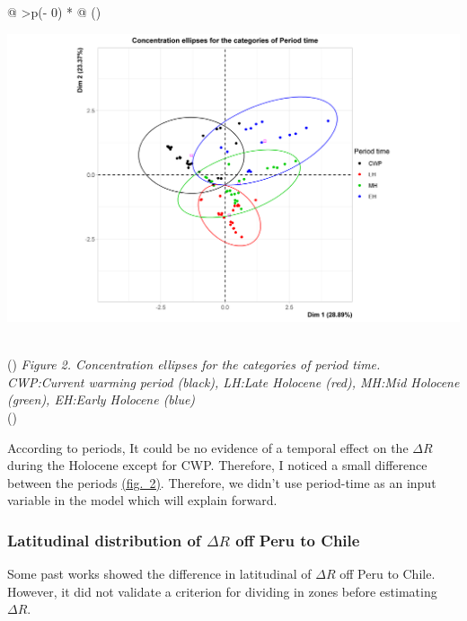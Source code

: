 \documentclass[
]{article}
\begin{document}
\begin{longtable}[]{@{}
  >{\centering\arraybackslash}p{(\columnwidth - 0\tabcolsep) * }@{}}
\toprule()
\begin{minipage}[b]{\linewidth}\centering
\href{https://github.com/jasb3110/Radiocarbon-reservoir/blob/db842ff0620d55ea5ca5ceec0d96a369406b6e3c/plotellipses.period.png?raw=true}{\includegraphics{plotellipses.period.png}}
\end{minipage} \\
\midrule()
\endhead
\emph{Figure 2. Concentration ellipses for the categories of period
time. CWP:Current warming period (black), LH:Late Holocene (red), MH:Mid
Holocene (green), EH:Early Holocene (blue)} \\
\bottomrule()
\end{longtable}

According to periods, It could be no evidence of a temporal effect on
the \(\Delta R\) during the Holocene except for CWP. Therefore, I
noticed a small difference between the periods
\protect\hyperlink{Clusters-of-mra-for-period-time}{(fig.~2)}.
Therefore, we didn't use period-time as an input variable in the model
which will explain forward.

\hypertarget{latitudinal-distribution-of-delta-r-off-peru-to-chile}{%
\subsubsection{\texorpdfstring{Latitudinal distribution of \(\Delta R\)
off Peru to
Chile}{Latitudinal distribution of \textbackslash Delta R off Peru to Chile}}\label{latitudinal-distribution-of-delta-r-off-peru-to-chile}}

Some past works showed the difference in latitudinal of \(\Delta R\) off
Peru to Chile. However, it did not validate a criterion for dividing in
zones before estimating \(\Delta R\).
\end{document}
